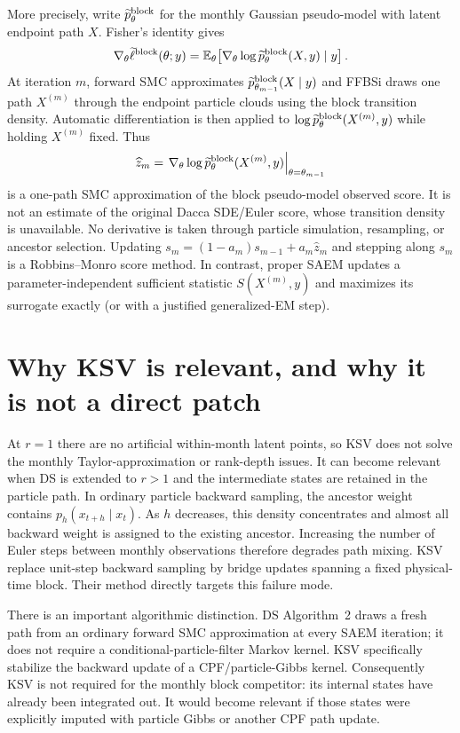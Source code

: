 \documentclass[11pt]{article}
\newcommand{\E}{\mathbb E}
\begin{document}
More precisely, write $\widetilde p^{\rm block}_\theta$ for the monthly
Gaussian pseudo-model with latent endpoint path $X$.  Fisher's identity gives
\[
 \nabla_\theta \widetilde\ell^{\rm block}(\theta;y)
 =\E_\theta\!\left[
   \nabla_\theta\log \widetilde p^{\rm block}_\theta(X,y)\mid y
 \right].
\]
At iteration $m$, forward SMC approximates
$\widetilde p^{\rm block}_{\theta_{m-1}}(X\mid y)$ and FFBSi draws one path
$X^{(m)}$ through the endpoint particle clouds using the block transition
density.  Automatic differentiation is then applied to
$\log \widetilde p^{\rm block}_\theta(X^{(m)},y)$ while holding $X^{(m)}$
fixed.  Thus
\[
 \widehat z_m=
 \left.\nabla_\theta\log \widetilde p^{\rm block}_\theta(X^{(m)},y)
 \right|_{\theta=\theta_{m-1}}
\]
is a one-path SMC approximation of the block pseudo-model observed score.  It
is not an estimate of the original Dacca SDE/Euler score, whose transition
density is unavailable.  No derivative is taken through particle simulation,
resampling, or ancestor selection.  Updating
$s_m=(1-a_m)s_{m-1}+a_m\widehat z_m$ and stepping along $s_m$ is a
Robbins--Monro score method.  In contrast, proper SAEM updates a
parameter-independent sufficient statistic $S(X^{(m)},y)$ and maximizes its
surrogate exactly (or with a justified generalized-EM step).

\section{Why KSV is relevant, and why it is not a direct patch}

At $r=1$ there are no artificial within-month latent points, so KSV does not
solve the monthly Taylor-approximation or rank-depth issues.  It can become
relevant when DS is extended to $r>1$ and the intermediate states are retained
in the particle path.  In ordinary particle backward sampling, the ancestor
weight contains
$p_h(x_{t+h}\mid x_t)$.  As $h$ decreases, this density concentrates and almost
all backward weight is assigned to the existing ancestor.  Increasing the
number of Euler steps between monthly observations therefore degrades path
mixing.  KSV replace unit-step backward sampling by bridge updates spanning a
fixed physical-time block.  Their method directly targets this failure mode.

There is an important algorithmic distinction.  DS Algorithm~2 draws a fresh
path from an ordinary forward SMC approximation at every SAEM iteration; it
does not require a conditional-particle-filter Markov kernel.  KSV specifically
stabilize the backward update of a CPF/particle-Gibbs kernel.  Consequently KSV
is not required for the monthly block competitor: its internal states have
already been integrated out.  It would become relevant if those states were
explicitly imputed with particle Gibbs or another CPF path update.
\end{document}
